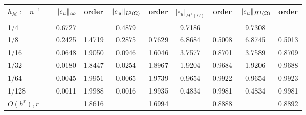 \begin{tabular}{lcccccccc}
    \hline
    $h_\mathcal{M}:=n^{-1}$ & $\lVert e_u\rVert_\infty$ & order & 
    $\lVert e_u\rVert_{L^2(\Omega)}$ & order & $|e_u|_{H^1(\Omega)}$ & order &
    $\lVert e_u\rVert_{H^1(\Omega)}$ & order \Tstrut\Bstrut \\
    \hline
      1/4    &0.6727    &          &0.4879    &          &9.7186    &          &9.7308    &      \Tstrut\\
      1/8    &0.2425    &1.4719    &0.2875    &0.7629    &6.8684    &0.5008    &6.8745    &0.5013\\
     1/16    &0.0648    &1.9050    &0.0946    &1.6046    &3.7577    &0.8701    &3.7589    &0.8709\\
     1/32    &0.0180    &1.8447    &0.0254    &1.8967    &1.9204    &0.9684    &1.9206    &0.9688\\
     1/64    &0.0045    &1.9951    &0.0065    &1.9739    &0.9654    &0.9922    &0.9654    &0.9923\\
    1/128    &0.0011    &1.9988    &0.0016    &1.9935    &0.4834    &0.9981    &0.4834    &0.9981\Bstrut\\ \hline\Tstrut
$O(h^r),r=$  &          &1.8616    &          &1.6994    &          &0.8888    &          &0.8892\Bstrut\\ 
    \hline
\end{tabular}
